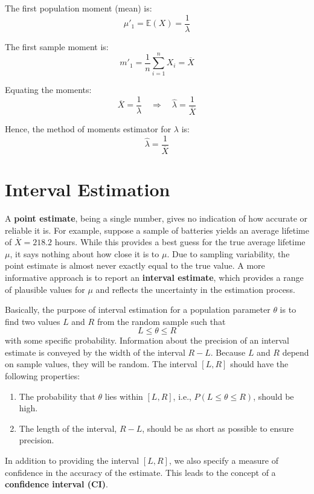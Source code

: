\documentclass[twoside]{book}
\begin{document}
The first population moment (mean) is:
\[
\mu'_1 = \mathbb{E}\left( X\right)  = \frac{1}{\lambda}
\]

The first sample moment is:
\[
m'_1 = \frac{1}{n} \sum_{i=1}^n X_i = \overline{X}
\]

Equating the moments:
\[
\overline{X} = \frac{1}{\lambda}
\quad \Rightarrow \quad
\hat{\lambda} = \frac{1}{\overline{X}}
\]

Hence, the method of moments estimator for \( \lambda \) is:
\[
\hat{\lambda} = \frac{1}{\overline{X}}
\]



\section{Interval Estimation}

A \textbf{point estimate}, being a single number, gives no indication of how accurate or reliable it is. For example, suppose a sample of batteries yields an average lifetime of \( \overline{X} = 218.2 \) hours. While this provides a best guess for the true average lifetime \( \mu \), it says nothing about how close it is to \( \mu \). Due to sampling variability, the point estimate is almost never exactly equal to the true value. A more informative approach is to report an \textbf{interval estimate}, which provides a range of plausible values for \( \mu \) and reflects the uncertainty in the estimation process.


Basically, the purpose of interval estimation for a population parameter $\theta$ is to find two values $L$ and $R$ from the random sample such that $$L \leq \theta \leq R$$ with some specific probability. Information about the precision of an interval estimate is conveyed by the
width of the interval $R-L$. Because $L$ and $R$ depend on sample values, they will be random. The interval $[L,R]$ should have the following properties:
\begin{enumerate}
    \item The probability that $\theta$ lies within $[L, R]$, i.e., $P(L \leq \theta \leq R)$, should be high.
    \item The length of the interval, $R - L$, should be as short as possible to ensure precision.
\end{enumerate}

In addition to providing the interval $[L, R]$, we also specify a measure of confidence in the accuracy of the estimate. This leads to the concept of a \textbf{confidence interval (CI)}.
\end{document}
